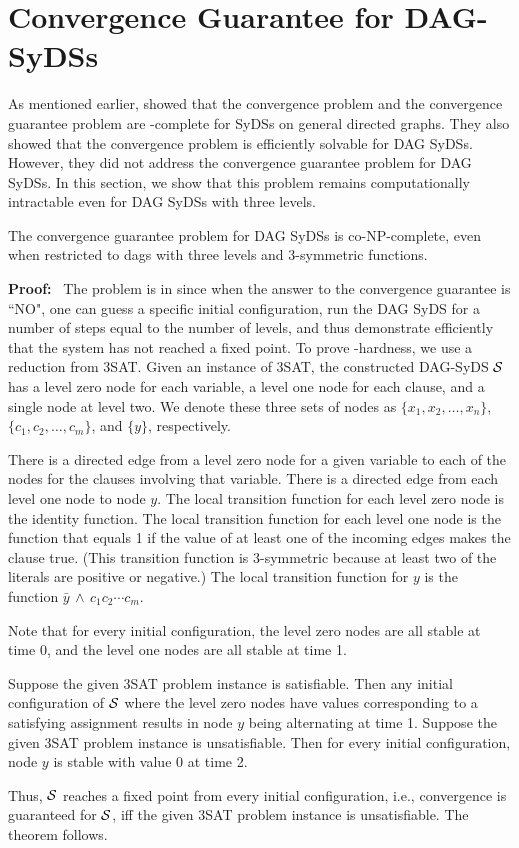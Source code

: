 \section{Convergence Guarantee for DAG-SyDSs}
\label{sec:conv_guarantee}

As mentioned earlier, \cite{Chistikov-etal-2020}
showed that the convergence problem and the convergence
guarantee problem are \cpsp-complete for SyDSs on general directed
graphs.
They also showed that the convergence problem is efficiently
solvable for DAG SyDSs.
However, they did not address the convergence guarantee problem
for DAG SyDSs.
In this section, we show that this problem 
remains computationally intractable even for
DAG SyDSs with three levels.

\begin{theorem}\label{thm:convergence_guaranee}
The convergence guarantee problem for DAG SyDSs is co-NP-complete,
even when restricted to dags with three levels and 3-symmetric functions.
\end{theorem}

\noindent
\textbf{Proof:}~ The problem is in \cconp{} since when the answer to the
convergence guarantee is ``NO", one can guess a specific initial configuration,
run the DAG SyDS for a number of steps equal to the number of levels, and
thus demonstrate efficiently that the system has not reached a fixed point.
To prove \cnp-hardness, we use a reduction from 3SAT.
Given an instance of 3SAT,
the constructed DAG-SyDS $\mbox{$\mathcal{S}$}$ has a level zero node for each variable, 
a level one node for each clause, and a single node at level two.
We denote these three sets of nodes as $\{x_1, x_2, \ldots , x_n\}$,
$\{c_1,c_2, \ldots , c_m\}$, and $\{y\}$, respectively.

There is a directed edge from a  level zero node for a given variable
to each of  the nodes for the clauses involving that variable.
There is a directed edge from each level one node to node $y$.  The
local transition function for each level zero node is the identity
function.  The local transition function for each level one node
is the function that equals 1
if the value of at least one of the incoming edges
makes the clause true.  (This transition function is 3-symmetric
because at least two of the literals are positive or negative.) The
local transition function for $y$ is the function 
$\bar{y} \, \wedge \, c_1 c_2 \cdots  c_{m}$.

Note that for every initial configuration, the level zero nodes are
all stable at time 0, and the level one nodes are all stable at
time 1.

Suppose the given 3SAT problem instance is satisfiable.
Then any initial configuration of $\mbox{$\mathcal{S}$}$ where the level zero nodes 
have values corresponding to a satisfying assignment
results in node $y$ being alternating at time 1.
Suppose the given 3SAT problem instance is unsatisfiable.
Then for every initial configuration, node $y$ is stable with value 0 at time 2.

\smallskip
Thus, $\mbox{$\mathcal{S}$}$ reaches a fixed point from every initial configuration, 
i.e.,  convergence is guaranteed for $\mbox{$\mathcal{S}$}$,
iff the given 3SAT problem instance is unsatisfiable.
The theorem follows.
\QED
